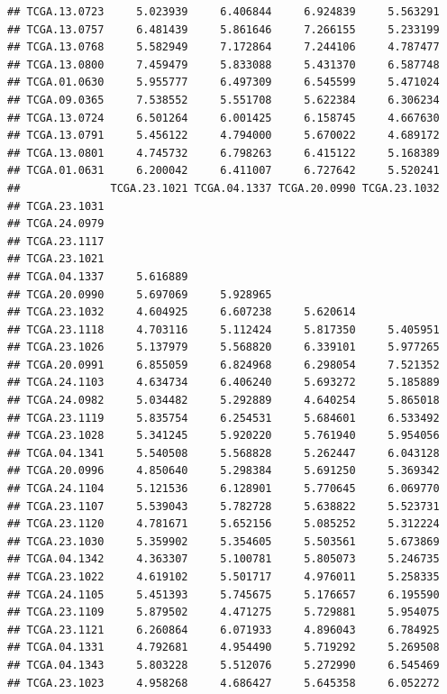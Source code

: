 \documentclass[UTF8]{beamer}\usepackage[]{graphicx}\usepackage[]{color}
\makeatletter
\newenvironment{kframe}{%
 \def\at@end@of@kframe{}%
 \ifinner\ifhmode%
  \def\at@end@of@kframe{\end{minipage}}%
  \begin{minipage}{\columnwidth}%
 \fi\fi%
 \def\FrameCommand##1{\hskip\@totalleftmargin \hskip-\fboxsep
 \colorbox{shadecolor}{##1}\hskip-\fboxsep
     \hskip-\linewidth \hskip-\@totalleftmargin \hskip\columnwidth}%
 \MakeFramed {\advance\hsize-\width
   \@totalleftmargin\z@ \linewidth\hsize
   \@setminipage}}%
 {\par\unskip\endMakeFramed%
 \at@end@of@kframe}
\newenvironment{knitrout}{}{} %
\makeatother
\begin{document}
\begin{frame}[fragile]
\begin{knitrout}
\begin{kframe}
\begin{verbatim}
## TCGA.13.0723     5.023939     6.406844     6.924839     5.563291
## TCGA.13.0757     6.481439     5.861646     7.266155     5.233199
## TCGA.13.0768     5.582949     7.172864     7.244106     4.787477
## TCGA.13.0800     7.459479     5.833088     5.431370     6.587748
## TCGA.01.0630     5.955777     6.497309     6.545599     5.471024
## TCGA.09.0365     7.538552     5.551708     5.622384     6.306234
## TCGA.13.0724     6.501264     6.001425     6.158745     4.667630
## TCGA.13.0791     5.456122     4.794000     5.670022     4.689172
## TCGA.13.0801     4.745732     6.798263     6.415122     5.168389
## TCGA.01.0631     6.200042     6.411007     6.727642     5.520241
##              TCGA.23.1021 TCGA.04.1337 TCGA.20.0990 TCGA.23.1032
## TCGA.23.1031                                                    
## TCGA.24.0979                                                    
## TCGA.23.1117                                                    
## TCGA.23.1021                                                    
## TCGA.04.1337     5.616889                                       
## TCGA.20.0990     5.697069     5.928965                          
## TCGA.23.1032     4.604925     6.607238     5.620614             
## TCGA.23.1118     4.703116     5.112424     5.817350     5.405951
## TCGA.23.1026     5.137979     5.568820     6.339101     5.977265
## TCGA.20.0991     6.855059     6.824968     6.298054     7.521352
## TCGA.24.1103     4.634734     6.406240     5.693272     5.185889
## TCGA.24.0982     5.034482     5.292889     4.640254     5.865018
## TCGA.23.1119     5.835754     6.254531     5.684601     6.533492
## TCGA.23.1028     5.341245     5.920220     5.761940     5.954056
## TCGA.04.1341     5.540508     5.568828     5.262447     6.043128
## TCGA.20.0996     4.850640     5.298384     5.691250     5.369342
## TCGA.24.1104     5.121536     6.128901     5.770645     6.069770
## TCGA.23.1107     5.539043     5.782728     5.638822     5.523731
## TCGA.23.1120     4.781671     5.652156     5.085252     5.312224
## TCGA.23.1030     5.359902     5.354605     5.503561     5.673869
## TCGA.04.1342     4.363307     5.100781     5.805073     5.246735
## TCGA.23.1022     4.619102     5.501717     4.976011     5.258335
## TCGA.24.1105     5.451393     5.745675     5.176657     6.195590
## TCGA.23.1109     5.879502     4.471275     5.729881     5.954075
## TCGA.23.1121     6.260864     6.071933     4.896043     6.784925
## TCGA.04.1331     4.792681     4.954490     5.719292     5.269508
## TCGA.04.1343     5.803228     5.512076     5.272990     6.545469
## TCGA.23.1023     4.958268     4.686427     5.645358     6.052272

\end{verbatim}
\end{kframe}
\end{knitrout}
\end{frame}
\end{document}
